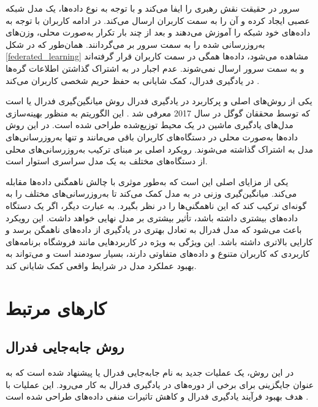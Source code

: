 سرور در حقیقت نقش رهبری را ایفا می‌کند و با توجه به نوع داده‌ها، یک مدل شبکه عصبی%
ایجاد کرده و آن را به سمت کاربران ارسال می‌کند. در ادامه کاربران با توجه به داده‌های خود شبکه را آموزش می‌دهند و بعد از چند بار تکرار به‌صورت محلی، وزن‌های به‌روزرسانی شده را به سمت سرور بر می‌گردانند. همان‌طور که در شکل
\ref{federated_learning}
مشاهده می‌شود، داده‌ها همگی در سمت کاربران قرار گرفته‌اند و به سمت سرور ارسال نمی‌شوند. عدم اجبار در به اشتراک گذاشتن اطلاعات گره‌ها در یادگیری فدرال، کمک شایانی به حفظ حریم شخصی کاربران می‌کند
\cite{smith2017federated}.



یکی از روش‌های اصلی و پرکاربرد در یادگیری فدرال روش میانگین‌گیری فدرال یا
است که توسط محققان گوگل در سال 2017 معرفی شد
\cite{mcmahan2017communication}.
این الگوریتم به منظور بهینه‌سازی مدل‌های یادگیری ماشین در یک محیط توزیع‌شده طراحی شده است. در این روش داده‌ها به‌صورت محلی در دستگاه‌های کاربران باقی می‌مانند و تنها به‌روزرسانی‌های مدل به اشتراک گذاشته می‌شوند. رویکرد اصلی
بر مبنای ترکیب به‌روزرسانی‌های محلی از دستگاه‌های مختلف به یک مدل سراسری استوار است.


یکی از مزایای اصلی
این است که به‌طور موثری با چالش ناهمگنی داده‌ها مقابله می‌کند.
میانگین‌گیری وزنی در
به مدل کمک می‌کند تا به‌روزرسانی‌های مختلف را به گونه‌ای ترکیب کند که این ناهمگنی‌ها را در نظر بگیرد. به عبارت دیگر، اگر یک دستگاه داده‌های بیشتری داشته باشد، تأثیر بیشتری بر مدل نهایی خواهد داشت. این رویکرد باعث می‌شود که مدل فدرال به تعادل بهتری در یادگیری از داده‌های ناهمگن برسد و کارایی بالاتری داشته باشد. این ویژگی به ویژه در کاربردهایی مانند فروشگاه برنامه‌های کاربردی که کاربران متنوع و داده‌های متفاوتی دارند، بسیار سودمند است و می‌تواند به بهبود عملکرد مدل در شرایط واقعی کمک شایانی کند.






\section{کارهای مرتبط}

\subsection{
	روش جابه‌جایی فدرال%
}
در این روش، یک عملیات جدید به نام جابه‌جایی فدرال یا
پیشنهاد شده است که به عنوان جایگزینی برای برخی از دوره‌های
در یادگیری فدرال به کار می‌رود.
این عملیات با هدف بهبود فرآیند یادگیری فدرال و کاهش تاثیرات منفی داده‌های
طراحی شده است
\cite{chiu2020semisupervised}.


